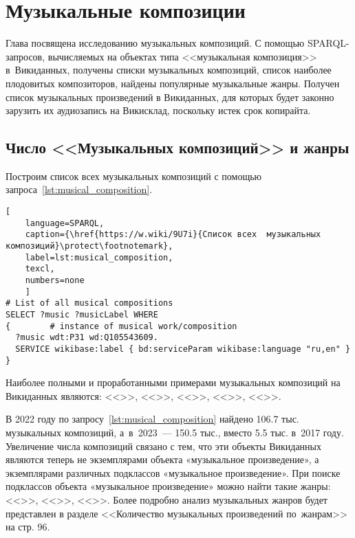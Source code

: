 \chapter{Музыкальные композиции}
\label{ch:musical-composition}
Глава посвящена исследованию музыкальных композиций. 
С помощью SPARQL-запросов, вычисляемых на объектах типа <<музыкальная композиция>> в~Викиданных, 
получены списки музыкальных композиций, список наиболее плодовитых композиторов, 
найдены популярные музыкальные жанры. 
Получен список музыкальных произведений в Викиданных, 
для которых будет законно зарузить их аудиозапись на Викисклад, поскольку истек срок копирайта.

\section{Число <<Музыкальных композиций>> и жанры}


Построим список всех музыкальных композиций с помощью запроса~\ref{lst:musical_composition}.

\begin{lstlisting}[ 
    language=SPARQL,
    caption={\href{https://w.wiki/9U7i}{Список всех  музыкальных композиций}\protect\footnotemark},
    label=lst:musical_composition,
    texcl,
    numbers=none
    ]
# List of all musical compositions
SELECT ?music ?musicLabel WHERE
{        # instance of musical work/composition
  ?music wdt:P31 wd:Q105543609. 
  SERVICE wikibase:label { bd:serviceParam wikibase:language "ru,en" }
}
\end{lstlisting}%

Наиболее полными и проработанными примерами музыкальных композиций на Викиданных являются: <<>>, <<>>, <<>>, <<>>, <<>>.

В 2022 году по запросу~\ref{lst:musical_composition} найдено \num{106,7} тыс. музыкальных композиций, 
а~в~2023~--- \num{150,5} тыс., вместо \num{5,5} тыс. в~2017 году. 
Увеличение числа композиций связано с тем, что эти объекты Викиданных являются теперь не экземплярами объекта «музыкальное произведение», а экземплярами различных подклассов «музыкальное произведение». При поиске подклассов объекта «музыкальное произведение» можно найти такие жанры: <<>>, <<>>, <<>>. Более подробно анализ музыкальных жанров будет представлен в разделе <<Количество музыкальных произведений по~жанрам>> на стр. 96.

